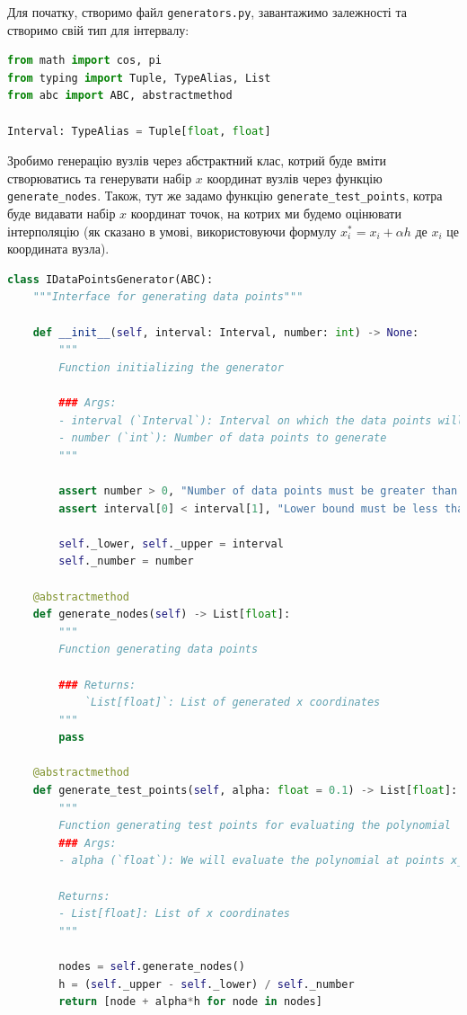 \documentclass[12pt]{extarticle}
\begin{document}
Для початку, створимо файл \texttt{generators.py}, завантажимо залежності та створимо свій тип для інтервалу:

\begin{lstlisting}[language=Python, caption=Завантаження залежностей]
from math import cos, pi
from typing import Tuple, TypeAlias, List
from abc import ABC, abstractmethod

Interval: TypeAlias = Tuple[float, float]
\end{lstlisting}

Зробимо генерацію вузлів через абстрактний клас, котрий буде вміти створюватись та генерувати набір $x$ координат вузлів через функцію \texttt{generate\_nodes}. Також, тут же задамо функцію \texttt{generate\_test\_points}, котра буде видавати набір $x$ координат точок, на котрих ми будемо оцінювати інтерполяцію (як сказано в умові, використовуючи формулу $x_i^* = x_i+\alpha h$ де $x_i$ це координата вузла).

\begin{lstlisting}[language=Python, caption=Задання абстрактного класу]
class IDataPointsGenerator(ABC):
    """Interface for generating data points"""
    
    def __init__(self, interval: Interval, number: int) -> None:
        """
        Function initializing the generator

        ### Args:
        - interval (`Interval`): Interval on which the data points will be generated
        - number (`int`): Number of data points to generate
        """
        
        assert number > 0, "Number of data points must be greater than 0"
        assert interval[0] < interval[1], "Lower bound must be less than upper bound"
        
        self._lower, self._upper = interval
        self._number = number
    
    @abstractmethod
    def generate_nodes(self) -> List[float]:
        """
        Function generating data points

        ### Returns:
            `List[float]`: List of generated x coordinates
        """
        pass
    
    @abstractmethod
    def generate_test_points(self, alpha: float = 0.1) -> List[float]:
        """
        Function generating test points for evaluating the polynomial
        ### Args:
        - alpha (`float`): We will evaluate the polynomial at points x_i + alpha*h

        Returns:
        - List[float]: List of x coordinates
        """
        
        nodes = self.generate_nodes()
        h = (self._upper - self._lower) / self._number
        return [node + alpha*h for node in nodes]
\end{lstlisting}
\end{document}
